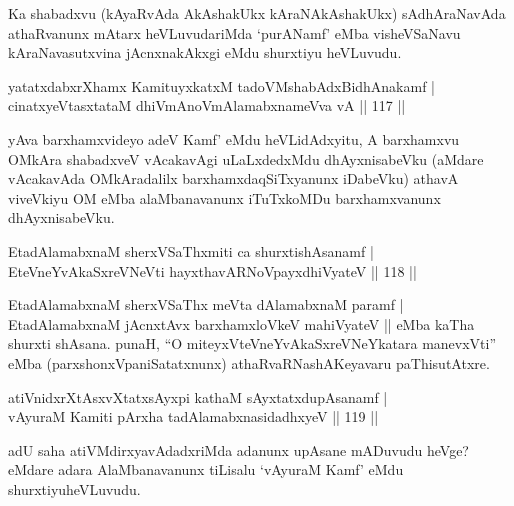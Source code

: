 \begin{artha}
Ka shabadxvu (kAyaRvAda AkAshakUkx kAraNAkAshakUkx) sAdhAraNavAda athaRvanunx mAtarx heVLuvudariMda `purANamf' eMba visheVSaNavu kAraNavasutxvina jAcnxnakAkxgi eMdu shurxtiyu heVLuvudu.
\end{artha}


\begin{shl}
yatatxdabxrXhamx KamituyxkatxM tadoVMshabAdxBidhAnakamf  | \\
cinatxyeVtasxtataM dhiVmAnoVmAlamabxnameVva vA \hfill||  117 ||  
\end{shl}

\begin{artha}
yAva barxhamxvideyo adeV Kamf' eMdu heVLidAdxyitu, A barxhamxvu OMkAra shabadxveV vAcakavAgi uLaLxdedxMdu dhAyxnisabeVku (aMdare vAcakavAda OMkAradalilx barxhamxdaqSiTxyanunx iDabeVku) athavA viveVkiyu OM eMba alaMbanavanunx iTuTxkoMDu barxhamxvanunx dhAyxnisabeVku.
\end{artha}


\begin{shl}
EtadAlamabxnaM sherxVSaThxmiti ca shurxtishAsanamf  | \\
EteVneYvAkaSxreVNeVti hayxthavARNoV\s payxdhiVyateV \hfill||  118 ||  
\end{shl}

\begin{artha}
EtadAlamabxnaM sherxVSaThx meVta dAlamabxnaM paramf | EtadAlamabxnaM jAcnxtAvx barxhamxloVkeV mahiVyateV || eMba kaTha shurxti shAsana. punaH, ``O miteyxVteVneYvAkaSxreVNeYkatara manevxVti'' eMba (parxshonxVpaniSatatxnunx) athaRvaRNashAKeyavaru paThisutAtxre.
\end{artha}


\begin{shl}
atiVnidxrXtAsxvXtatxsAyxpi kathaM sAyxtatxdupAsanamf   | \\
vAyuraM Kamiti pArxha tadAlamabxnasidadhxyeV \hfill||  119 ||  
\end{shl}

\begin{artha}
adU saha atiVMdirxyavAdadxriMda adanunx upAsane mADuvudu heVge? eMdare adara AlaMbanavanunx tiLisalu `vAyuraM Kamf' eMdu shurxtiyu\break heVLuvudu.
\end{artha}

